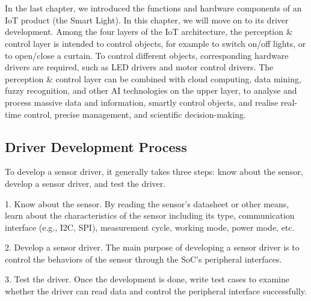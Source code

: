 \documentclass[a4paper,12pt]{book}
\begin{document}

\chapter[Driver Development]{}

\vspace{36pt}
In the last chapter, we introduced the functions and hardware components of an IoT product (the Smart Light). In this chapter, we will move on to its driver development. Among the four layers of the IoT architecture, the perception \& control layer is intended to control objects, for example to switch on/off lights, or to open/close a curtain. To control different objects, corresponding hardware drivers are required, such as LED drivers and motor control drivers. The perception \& control layer can be combined with cloud computing, data mining, fuzzy recognition, and other AI technologies on the upper layer, to analyse and process massive data and information, smartly control objects, and realise real-time control, precise management, and scientific decision-making.

\section{Driver Development Process}
To develop a sensor driver, it generally takes three steps: know about the sensor, develop a sensor driver, and test the driver.

\begin{term}{1. Know about the sensor.}
    By reading the sensor’s datasheet or other means, learn about the characteristics of the sensor including its type, communication interface (e.g., I2C, SPI), measurement cycle, working mode, power mode, etc.
\end{term}

\begin{term}{2. Develop a sensor driver.}
    The main purpose of developing a sensor driver is to control the behaviors of the sensor through the SoC’s peripheral interfaces.
\end{term}

\begin{term}{3. Test the driver.}
    Once the development is done, write test cases to examine whether the driver can read data and control the peripheral interface successfully.
\end{term}
\end{document}
